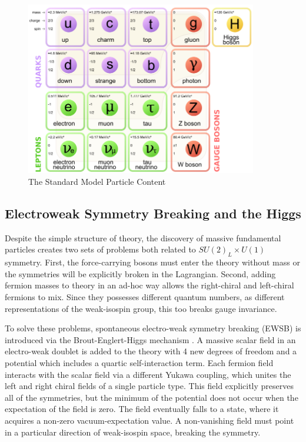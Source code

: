 \begin{figure}[!t]
\centering 
\includegraphics[width=0.9\textwidth]{figs/theory/iaGJO.png}
\caption{ The Standard Model Particle Content
 } \label{figure:theory_sm}
\end{figure}


\subsection{Electroweak Symmetry Breaking and the Higgs}

Despite the simple structure of theory, the discovery of massive fundamental
particles creates two sets of problems both related to $SU(2)_{L} \times U(1)$ symmetry. First, the force-carrying bosons must enter the theory
without mass or the symmetries will be explicitly broken in the Lagrangian. Second, adding
fermion masses to theory in an ad-hoc way allows the right-chiral and
left-chiral fermions to mix. Since they possesses different quantum numbers, as
different representations of the weak-isospin group, this too breaks gauge
invariance. 

To solve these problems, spontaneous electro-weak symmetry breaking (EWSB) is
introduced via the Brout-Englert-Higgs mechanism \cite{Higgs:1964pj, Higgs:1966ev,Englert:1964et}. A  massive scalar field
in an electro-weak doublet is added to the theory with 4 new
degrees of freedom and a potential which includes a 
quartic self-interaction term. Each fermion field interacts with the scalar field via
a different Yukawa coupling, which unites the left and right chiral fields
of a single particle type.  This field
explicitly preserves all of the symmetries, but the minimum of the potential does not
occur when the expectation of the field is zero. The field
eventually falls to a state, where it acquires a non-zero vacuum-expectation
value. A non-vanishing field must point in a
particular direction of weak-isospin space, breaking the symmetry.

